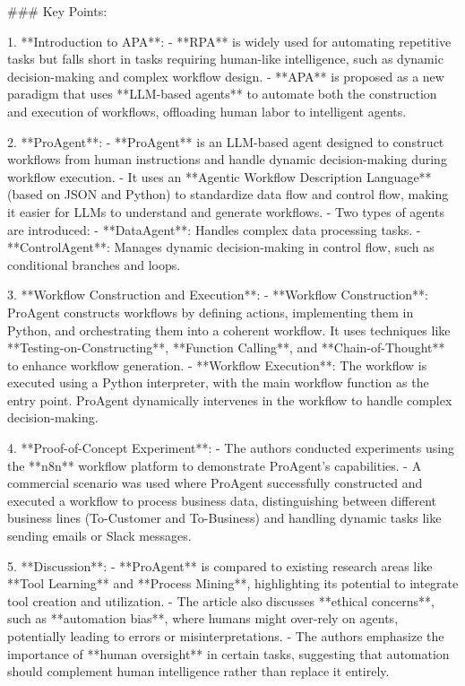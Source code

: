 ### Key Points:

1. **Introduction to APA**:
   - **RPA** is widely used for automating repetitive tasks but falls short in tasks requiring human-like intelligence, such as dynamic decision-making and complex workflow design.
   - **APA** is proposed as a new paradigm that uses **LLM-based agents** to automate both the construction and execution of workflows, offloading human labor to intelligent agents.

2. **ProAgent**:
   - **ProAgent** is an LLM-based agent designed to construct workflows from human instructions and handle dynamic decision-making during workflow execution.
   - It uses an **Agentic Workflow Description Language** (based on JSON and Python) to standardize data flow and control flow, making it easier for LLMs to understand and generate workflows.
   - Two types of agents are introduced:
     - **DataAgent**: Handles complex data processing tasks.
     - **ControlAgent**: Manages dynamic decision-making in control flow, such as conditional branches and loops.

3. **Workflow Construction and Execution**:
   - **Workflow Construction**: ProAgent constructs workflows by defining actions, implementing them in Python, and orchestrating them into a coherent workflow. It uses techniques like **Testing-on-Constructing**, **Function Calling**, and **Chain-of-Thought** to enhance workflow generation.
   - **Workflow Execution**: The workflow is executed using a Python interpreter, with the main workflow function as the entry point. ProAgent dynamically intervenes in the workflow to handle complex decision-making.

4. **Proof-of-Concept Experiment**:
   - The authors conducted experiments using the **n8n** workflow platform to demonstrate ProAgent's capabilities.
   - A commercial scenario was used where ProAgent successfully constructed and executed a workflow to process business data, distinguishing between different business lines (To-Customer and To-Business) and handling dynamic tasks like sending emails or Slack messages.

5. **Discussion**:
   - **ProAgent** is compared to existing research areas like **Tool Learning** and **Process Mining**, highlighting its potential to integrate tool creation and utilization.
   - The article also discusses **ethical concerns**, such as **automation bias**, where humans might over-rely on agents, potentially leading to errors or misinterpretations.
   - The authors emphasize the importance of **human oversight** in certain tasks, suggesting that automation should complement human intelligence rather than replace it entirely.

